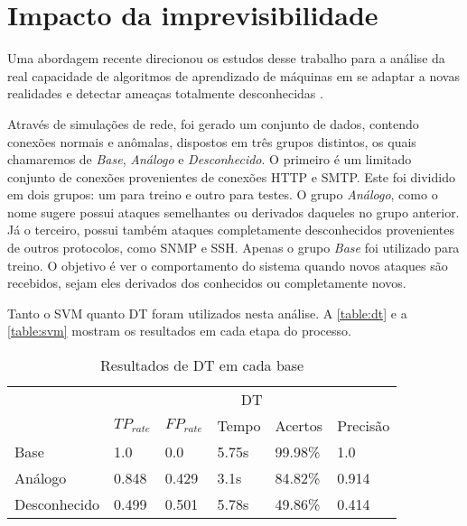 \section{Impacto da imprevisibilidade}
Uma abordagem recente direcionou os estudos desse trabalho para a análise da real capacidade de algoritmos de
aprendizado de máquinas em se adaptar a novas realidades e detectar ameaças totalmente desconhecidas \cite{sommer10}.
\par Através de simulações de rede, foi gerado um conjunto de dados, contendo conexões normais e anômalas,
dispostos em três grupos distintos, os quais chamaremos de \textit{Base}, \textit{Análogo} e \textit{Desconhecido}.
O primeiro é um limitado conjunto de conexões provenientes de conexões HTTP e SMTP. Este foi dividido em dois grupos:
um para treino e outro para testes. O grupo \textit{Análogo}, como o nome sugere possui ataques semelhantes ou derivados
 daqueles no grupo anterior. Já o terceiro, possui também ataques completamente desconhecidos provenientes de outros
protocolos, como SNMP e SSH. Apenas o grupo \textit{Base} foi utilizado para treino. O objetivo é ver o comportamento do sistema quando novos
ataques são recebidos, sejam eles derivados dos conhecidos ou completamente novos.
\par Tanto o SVM quanto DT foram utilizados nesta análise. A \ref{table:dt} e a \ref{table:svm} mostram os resultados
em cada etapa do processo.

\begin{table}[h]
    \centering
    \caption{Resultados de DT em cada base}
    \label{table:dtattrless}
    \begin{tabular}{l|l|l|l|l|l|}
        \cline{2-6}
                                                                   & \multicolumn{5}{c|}{\cellcolor[HTML]{EFEFEF}DT}        \\ \cline{2-6}
                                                                   & $TP_{rate}$ & $FP_{rate}$ & Tempo & Acertos & Precisão \\ \hline
        \multicolumn{1}{|l|}{\cellcolor[HTML]{EFEFEF}Base}         & 1.0         & 0.0         & 5.75s & 99.98\% & 1.0      \\ \hline
        \multicolumn{1}{|l|}{\cellcolor[HTML]{EFEFEF}Análogo}      & 0.848       & 0.429       & 3.1s  & 84.82\% & 0.914    \\ \hline
        \multicolumn{1}{|l|}{\cellcolor[HTML]{EFEFEF}Desconhecido} & 0.499       & 0.501       & 5.78s & 49.86\% & 0.414    \\ \hline
    \end{tabular}
\end{table}

